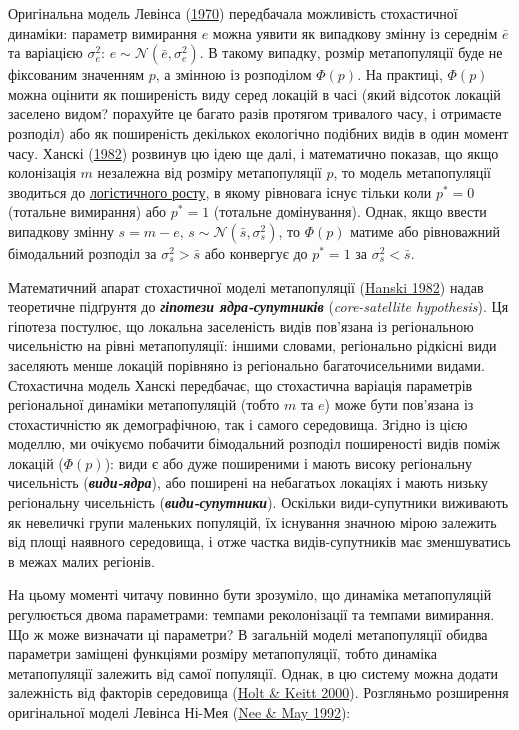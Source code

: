 \documentclass[
  11pt,
]{book}
\begin{document}
Оригінальна модель Левінса (\href{https://books.google.com/books/about/Lectures_on_Mathematics_in_the_Life_Scie.html?id=wxEeAQAAIAAJ}{1970}) передбачала можливість стохастичної динаміки: параметр вимирання \(e\) можна уявити як випадкову змінну із середнім \(\bar{e}\) та варіацією \(\sigma_e^2\): \(e \sim \mathcal{N}(\bar{e}, \sigma_e^2)\). В такому випадку, розмір метапопуляції буде не фіксованим значенням \(p\), а змінною із розподілом \(\Phi(p)\). На практиці, \(\Phi(p)\) можна оцінити як поширеність виду серед локацій в часі (який відсоток локацій заселено видом? порахуйте це багато разів протягом тривалого часу, і отримаєте розподіл) або як поширеність декількох екологічно подібних видів в один момент часу. Ханскі (\href{https://doi.org/10.2307/3544021}{1982}) розвинув цю ідею ще далі, і математично показав, що якщо колонізація \(m\) незалежна від розміру метапопуляції \(p\), то модель метапопуляції зводиться до \hyperref[pop-dynamics]{логістичного росту}, в якому рівновага існує тільки коли \(p^* = 0\) (тотальне вимирання) або \(p^* = 1\) (тотальне домінування). Однак, якщо ввести випадкову змінну \(s = m - e\), \(s \sim \mathcal{N}( \bar{s}, \sigma_s^2)\), то \(\Phi(p)\) матиме або рівноважний бімодальний розподіл за \(\sigma_s^2 > \bar{s}\) або конвергує до \(p^*=1\) за \(\sigma_s^2 < \bar{s}\).

Математичний апарат стохастичної моделі метапопуляції (\href{https://doi.org/10.2307/3544021}{Hanski 1982}) надав теоретичне підґрунтя до \textbf{\emph{гіпотези ядра-супутників}} (\emph{core-satellite hypothesis}). Ця гіпотеза постулює, що локальна заселеність видів пов'язана із регіональною чисельністю на рівні метапопуляції: іншими словами, регіонально рідкісні види заселяють менше локацій порівняно із регіонально багаточисельними видами. Стохастична модель Ханскі передбачає, що стохастична варіація параметрів регіональної динаміки метапопуляцій (тобто \(m\) та \(e\)) може бути пов'язана із стохастичністю як демографічною, так і самого середовища. Згідно із цією моделлю, ми очікуємо побачити бімодальний розподіл поширеності видів поміж локацій (\(\Phi(p)\)): види є або дуже поширеними і мають високу регіональну чисельність (\textbf{\emph{види-ядра}}), або поширені на небагатьох локаціях і мають низьку регіональну чисельність (\textbf{\emph{види-супутники}}). Оскільки види-супутники виживають як невеличкі групи маленьких популяцій, їх існування значною мірою залежить від площі наявного середовища, і отже частка видів-супутників має зменшуватись в межах малих регіонів.

На цьому моменті читачу повинно бути зрозуміло, що динаміка метапопуляцій регулюється двома параметрами: темпами реколонізації та темпами вимирання. Що ж може визначати ці параметри? В загальній моделі метапопуляції обидва параметри заміщені функціями розміру метапопуляції, тобто динаміка метапопуляції залежить від самої популяції. Однак, в цю систему можна додати залежність від факторів середовища (\href{htpps://doi.org/10.1046/j.1461-0248.2000.00116.x}{Holt \& Keitt 2000}). Розгляньмо розширення оригінальної моделі Левінса Ні-Мея (\href{https://doi.org/10.2307/5506}{Nee \& May 1992}):
\end{document}
